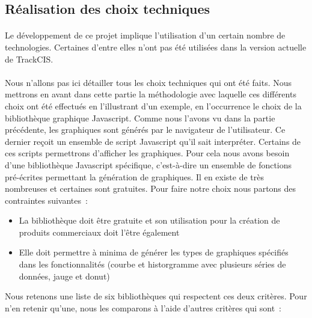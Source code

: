 		\subsection{Réalisation des choix techniques}
			\paragraph{}%
			Le développement de ce projet implique l'utilisation d'un certain nombre de
			technologies. Certaines d'entre elles n'ont pas été utilisées dans la version
			actuelle de TrackCIS.
			
			\paragraph{}%
			Nous n'allons pas ici détailler tous les choix techniques qui ont été faits.
			Nous mettrons en avant dans cette partie la méthodologie avec laquelle ces
			différents choix ont été effectués en l'illustrant d'un exemple, en
			l'occurrence le choix de la bibliothèque graphique Javascript. Comme nous
			l'avons vu dans la partie précédente, les graphiques sont
			générés par le navigateur de l'utilisateur. Ce dernier reçoit un ensemble
			de script Javascript qu'il sait interpréter. Certains de ces scripts
			permettrons d'afficher les graphiques. Pour cela nous avons besoin d'une
			bibliothèque Javascript spécifique, c'est-à-dire un ensemble de fonctions
			pré-écrites permettant la génération de graphiques.
			Il en existe de très nombreuses et certaines sont gratuites. Pour
			faire notre choix nous partons des contraintes suivantes~:
			\begin{itemize}
			  \item La bibliothèque doit être gratuite et son utilisation pour la
			  création de produits commerciaux doit l'être également
			  \item Elle doit permettre à minima de générer les types de graphiques
			  spécifiés dans les fonctionnalités (courbe et historgramme avec plusieurs
			  séries de données, jauge et donut)
			\end{itemize}
			Nous retenons une liste de six bibliothèques qui respectent ces deux
			critères.
			Pour n'en retenir qu'une, nous les comparons à l'aide d'autres critères qui
			sont~:

